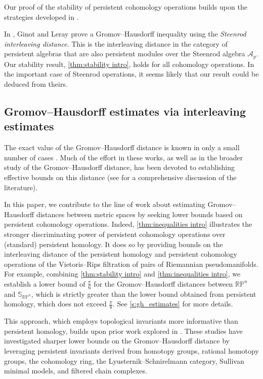 \documentclass{amsart}
\theoremstyle{definition}
\newcommand{\bS}{\mathbb{S}}
\theoremstyle{theorem}
\newcommand{\rp}{\mathbb{RP}}
\begin{document}
Our proof of the stability of persistent cohomology operations builds upon the strategies developed in \cite{blumberg2023interleaving, zhou2023beyond, memoli2024persistent}.

In \cite[Theorem~87]{ginot2019distances}, Ginot and Leray prove a Gromov--Hausdorff inequality using the \textit{Steenrod interleaving distance}.
This is the interleaving distance in the category of persistent algebras that are also persistent modules over the Steenrod algebra \(\mathcal{A}_p\).
Our stability result, \cref{thm:stability intro}, holds for all cohomology operations.
In the important case of Steenrod operations, it seems likely that our result could be deduced from theirs.

\subsection*{Gromov--Hausdorff estimates via interleaving estimates}

The exact value of the Gromov--Hausdorff distance is known in only a small number of cases \cite{memoli2012some,ji2021gromov,adams2022gromov,talipov2022gromov,lim2021gromov,harrison2023quantitative,saul2024gromov,saul2024some}.
Much of the effort in these works, as well as in the broader study of the Gromov--Hausdorff distance, has been devoted to establishing effective bounds on this distance (see \cite{lim2021gromov} for a comprehensive discussion of the literature).

In this paper, we contribute to the line of work about estimating Gromov--Hausdorff distances between metric spaces by seeking lower bounds based on persistent cohomology operations.
Indeed, \cref{thm:inequalities intro} illustrates the stronger discriminating power of persistent cohomology operations over (standard) persistent homology.
It does so by providing bounds on the interleaving distance of the persistent homology and persistent cohomology operations of the Vietoris--Rips filtration of pairs of Riemannian pseudomanifolds.
For example, combining \cref{thm:stability intro} and \cref{thm:inequalities intro}, we establish a lower bound of $\frac{\pi}{6}$ for the Gromov--Hausdorff distances between \(\rp^n\) and \(\bS_{\rp^n}\), which is strictly greater than the lower bound obtained from persistent homology, which does not exceed $\frac{\pi}{8}$.
See \cref{s:gh_estimates} for more details.

This approach, which employs topological invariants more informative than persistent homology, builds upon prior work explored in \cite{zhou2023beyond, zhou2023persistent, memoli2024persistenthomotopy, memoli2024persistent, memoli2025ephemeral}.
These studies have investigated sharper lower bounds on the Gromov--Hausdorff distance by leveraging persistent invariants derived from homotopy groups, rational homotopy groups, the cohomology ring, the Lyusternik--Schnirelmann category, Sullivan minimal models, and filtered chain complexes.
\end{document}
